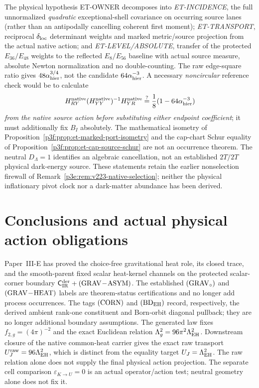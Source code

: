\documentclass[12pt,a4paper]{article}
\begin{document}
\begin{remark}
\label{p3e:rem:et-owner-gates}
The physical hypothesis ET-OWNER decomposes into
\emph{ET-INCIDENCE}, the full unnormalized \emph{quadratic}
exceptional-shell covariance on occurring source lanes (rather than
an antipodally cancelling coherent first moment);
\emph{ET-TRANSPORT}, reciprocal $\delta_{\rm loc}$ determinant weights
and marked metric/source projection from the actual native action;
and \emph{ET-LEVEL/ABSOLUTE}, transfer of the protected $E_{36}/E_{48}$
weights to the reflected $E_8/E_{56}$ baseline with actual source
measure, absolute Newton normalization and no double-counting.
The raw edge-square ratio gives $48\alpha_{\rm hier}^{3/4}$,
not the candidate $64\alpha_{\rm hier}^{-3}$.
A necessary \emph{noncircular} reference check would be to calculate
\[
 H_{RY}^{\rm native}(H_{YY}^{\rm native})^{-1}H_{YR}^{\rm native}
 \overset{?}{=}\frac18(1-64\alpha_{\rm hier}^{-3})
\]
\emph{from the native source action before substituting either
endpoint coefficient}; it must additionally fix $B_I$ absolutely.
The mathematical isometry of Proposition~\ref{p3f:prop:et-marked-port-isometry}
and the cap-chart Schur equality of
Proposition~\ref{p3f:prop:et-cap-source-schur}
are not an occurrence theorem.
The neutral $D_\Lambda=1$ identifies an algebraic cancellation,
not an established $2T/2T$ physical dark-energy source.
These statements retain the earlier nonselection firewall of
Remark~\ref{p3e:rem:v223-native-selection}; neither the physical
inflationary pivot clock nor a dark-matter abundance has been derived.
\end{remark}

\section{Conclusions and actual physical action obligations}
\label{paper3e:sec:organized-conclusion}

\label{p3e:sec:conclusion}
Paper~III-E has proved the choice-free gravitational heat role, its closed
trace, and the smooth-parent fixed scalar heat-kernel channels on the protected
scalar-corner boundary
\(\mathsf C_{\rm IR}^{\rm der}+({\rm GRAV\!-\!ASYM})\).
The established \(({\rm GRAV}_{\circ})\) and
\(({\rm GRAV\!-\!HEAT})\) labels are theorem-status certifications and no
longer add process occurrences.
The tags \(({\rm CORN})\) and \(({\rm BD}_{\rm EH})\) record, respectively,
the derived ambient rank-one constituent and Born-orbit diagonal pullback;
they are no longer additional boundary assumptions.  The generated law fixes
\(f_{2,g}=(4\pi)^{-2}\) and the exact Euclidean relation
\(\Lambda_g^2=96\pi^2\Lambda_{\rm EH}^2\).  Downstream closure of the native
common-heat carrier gives the exact raw transport
\(U_{J}^{\rm raw}=96\Lambda_{\rm EH}^2\), which is distinct from the equality
target \(U_{J}=\Lambda_{\rm EH}^2\).  The raw relation alone does not supply the final physical action
projection. The separate cell comparison $\varepsilon_{K\to U}=0$ is
an actual operator/action test; neutral geometry alone does not fix it.
\end{document}
